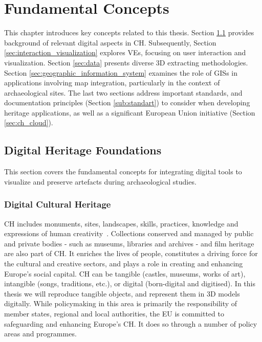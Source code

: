 
%

\chapter{Fundamental Concepts}
\label{cha:fundamental_concepts}

This chapter introduces key concepts related to this thesis. Section \ref{sec:digital_heritage_foundation}
provides background of relevant digital aspects in \gls{CH}.
Subsequently, Section \ref{sec:interaction_visualization} explores \glspl{VE}, focusing on user interaction and visualization. 
Section \ref{sec:data} presents diverse \gls{3D} extracting methodologies.
Section \ref{sec:geographic_information_system} examines the role of \glspl{GIS} in applications involving map integration, particularly in the context of archaeological sites. 
The last two sections address important standards, and documentation principles (Section \ref{sub:standart}) to consider when developing heritage applications, as well as a significant European Union initiative (Section \ref{sec:ch_cloud}).

\section{Digital Heritage Foundations}
\label{sec:digital_heritage_foundation}

This section covers the fundamental concepts for integrating digital tools to visualize and preserve artefacts during archaeological studies.

\subsection{Digital Cultural Heritage}
\label{sec:digital_heritage}

\gls{CH} includes monuments, sites, landscapes, skills, practices, knowledge and expressions of human creativity~\cite{eu_cultural_heritage}. Collections conserved and managed by public and private bodies - such as museums, libraries and archives - and film heritage are also part of CH. It enriches the lives of people, constitutes a driving force for the cultural and creative sectors, and plays a role in creating and enhancing Europe's social capital.
\gls{CH} can be tangible (castles, museums, works of art), intangible (songs, traditions, etc.), or
digital (born-digital and digitised). In this thesis we will reproduce tangible objects, and represent them in \gls{3D} models digitally.
While policymaking in this area is primarily the responsibility of member states, regional and local authorities, the \gls{EU} is committed to safeguarding and enhancing Europe's \gls{CH}. It does so through a number of policy areas and programmes.


